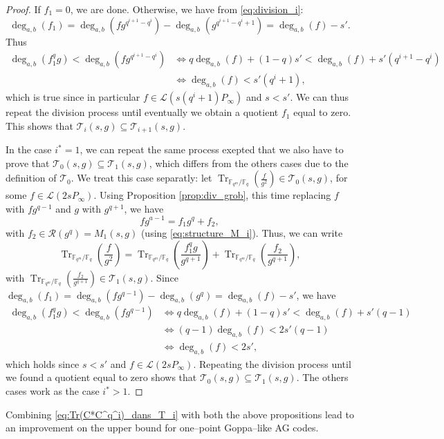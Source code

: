\documentclass[a4paper]{article}
\theoremstyle{definition}
\theoremstyle{remark}
\newcommand{\calL}{\mathcal{L}}
\newcommand{\calR}{\mathcal{R}}
\newcommand{\calT}{\mathcal{T}}
\newcommand{\fq}{\mathbb{F}_{q}}
\newcommand{\Tr}[1]{\operatorname{Tr}_{\mathbb{F}_{q^m}/\fq}\left(#1\right)}
\newcommand{\degab}[1]{\deg_{a,b}\left(#1\right)}
\begin{document}
\begin{proof}
If $f_1=0$, we are done. Otherwise, we have from \eqref{eq:division_i}:
$$\degab{f_1} = \degab{fg^{q^{i+1}-q^i}} - \degab{g^{q^{i+1}-q^i+1}} = \degab{f}-s'.$$
Thus
\begin{align*}
     \degab{f_1^qg} < \degab{fg^{q^{i+1}-q^i}} & \iff q\degab{f} +(1-q)s' < \degab{f} +s'(q^{i+1}-q^i) \\
                                               & \iff \degab{f} < s'(q^{i}+1),
\end{align*}
which is true since in particular $f \in \calL(s(q^i+1)P_\infty)$ and $s<s'$. We can thus repeat the division process until eventually we obtain a quotient $f_1$ equal to zero. This shows that $\calT_i(s,g) \subseteq \calT_{i+1}(s,g)$.

In the case $i^*=1$, we can repeat the same process exepted that we also have to prove that $\calT_0(s,g) \subseteq \calT_1(s,g)$, which differs from the others cases due to the definition of $\calT_0$. We treat this case separatly: let $\Tr{\frac{f}{g^2}} \in \calT_0(s,g)$, for some $f \in \calL(2sP_\infty)$. Using Proposition \ref{prop:div_grob}, this time replacing $f$ with $fg^{q-1}$ and $g$ with $g^{q+1}$, we have
$$fg^{a-1} = f_1g^q + f_2,$$ with $f_2 \in \calR(g^q) = M_1(s,g)$ (using \eqref{eq:structure_M_i}).
Thus, we can write
    $$ \Tr{\frac{f}{g^2}} = \Tr{\frac{f_1^qg}{g^{q+1}}}  + \Tr{\frac{f_2}{g^{q+1}}}, $$
with $\Tr{\frac{f_2}{g^{q+1}}} \in \calT_1(s,g)$. Since $\degab{f_1} = \degab{fg^{q-1}} - \degab{g^q} = \degab{f}-s'$, we have 
\begin{align*}
     \degab{f_1^qg} < \degab{fg^{q-1}} & \iff q\degab{f} +(1-q)s' < \degab{f} + s'(q-1)\\
                                               & \iff (q-1)\degab{f} < 2s'(q-1)\\
                                               & \iff \degab{f} < 2s',
\end{align*}
which holds since $s<s'$ and $f \in \calL(2sP_\infty)$. Repeating the division process until we found a quotient equal to zero shows that $\calT_0(s,g) \subseteq \calT_1(s,g)$. The others cases work as the case $i^* > 1$.
\end{proof}

Combining \ref{eq:Tr(C*C^q^i)_dans_T_i} with both the above propositions lead to an improvement on the upper bound for one--point Goppa--like AG codes. 
\end{document}
